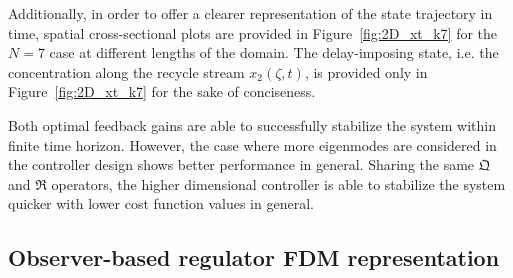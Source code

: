 Additionally, in order to offer a clearer representation of the state trajectory in time, spatial cross-sectional plots are provided in Figure~\ref{fig:2D_xt_k7} for the $N=7$ case at different lengths of the domain. The delay-imposing state, i.e. the concentration along the recycle stream $x_2(\zeta,t)$, is provided only in Figure~\ref{fig:2D_xt_k7} for the sake of conciseness.

Both optimal feedback gains are able to successfully stabilize the system within finite time horizon. However, the case where more eigenmodes are considered in the controller design shows better performance in general. Sharing the same $\mathfrak{Q}$ and $\mathfrak{R}$ operators, the higher dimensional controller is able to stabilize the system quicker with lower cost function values in general.




\subsection{Observer-based regulator FDM representation}

